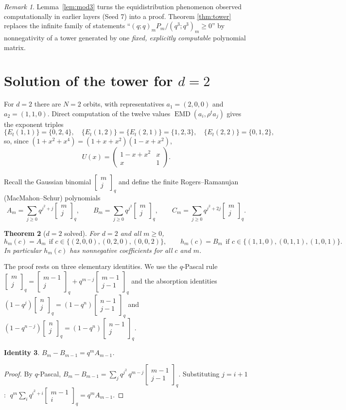\documentclass[11pt]{article}
\newtheorem{theorem}{Theorem}
\newtheorem{identity}[theorem]{Identity}
\theoremstyle{remark}
\newtheorem{remark}[theorem]{Remark}
\newcommand{\emd}{\operatorname{EMD}}
\newcommand{\qbin}[2]{\begin{bmatrix}#1\\#2\end{bmatrix}_q}
\begin{document}
\begin{remark}
Lemma~\ref{lem:mod3} turns the equidistribution phenomenon observed
computationally in earlier layers (Seed 7) into a proof. Theorem
\ref{thm:tower} replaces the infinite family of statements
``$(q;q)_m P_m/(q^3;q^3)_m\ge 0$'' by nonnegativity of a tower generated
by one \emph{fixed, explicitly computable} polynomial matrix.
\end{remark}

\section{Solution of the tower for $d=2$}

For $d=2$ there are $N=2$ orbits, with representatives $a_1=(2,0,0)$ and
$a_2=(1,1,0)$. Direct computation of the twelve values
$\emd(a_i,\rho^t a_j)$ gives the exponent triples
\[
\{E_t(1,1)\}=\{0,2,4\},\quad
\{E_t(1,2)\}=\{E_t(2,1)\}=\{1,2,3\},\quad
\{E_t(2,2)\}=\{0,1,2\},
\]
so, since $(1+x^2+x^4)=(1+x+x^2)(1-x+x^2)$,
\[
U(x)=\begin{pmatrix}1-x+x^2 & x\\ x & 1\end{pmatrix}.
\]

Recall the Gaussian binomial $\qbin{m}{j}$ and define the finite
Rogers--Ramanujan (MacMahon--Schur) polynomials
\[
A_m=\sum_{j\ge 0} q^{j^2+j}\qbin{m}{j},\qquad
B_m=\sum_{j\ge 0} q^{j^2}\qbin{m}{j},\qquad
C_m=\sum_{j\ge 0} q^{j^2+2j}\qbin{m}{j}.
\]

\begin{theorem}[$d=2$ solved]\label{thm:d2}
For $d=2$ and all $m\ge 0$,
\[
h_m(c)=A_m \ \ \text{if } c\in\{(2,0,0),(0,2,0),(0,0,2)\},
\qquad
h_m(c)=B_m \ \ \text{if } c\in\{(1,1,0),(0,1,1),(1,0,1)\}.
\]
In particular $h_m(c)$ has nonnegative coefficients for all $c$ and $m$.
\end{theorem}

The proof rests on three elementary identities. We use the $q$-Pascal rule
$\qbin{m}{j}=\qbin{m-1}{j}+q^{m-j}\qbin{m-1}{j-1}$ and the absorption
identities $(1-q^j)\qbin{n}{j}=(1-q^n)\qbin{n-1}{j-1}$ and
$(1-q^{n-j})\qbin{n}{j}=(1-q^n)\qbin{n-1}{j}$.

\begin{identity}\label{id:B}
$B_m-B_{m-1}=q^m A_{m-1}$.
\end{identity}
\begin{proof}
By $q$-Pascal, $B_m-B_{m-1}=\sum_j q^{j^2}\,q^{m-j}\qbin{m-1}{j-1}$.
Substituting $j=i+1$: $\;q^m\sum_i q^{i^2+i}\qbin{m-1}{i}=q^mA_{m-1}$.
\end{proof}
\end{document}
